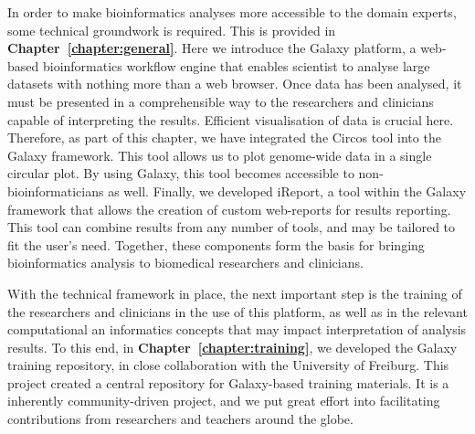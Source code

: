 In order to make bioinformatics analyses more accessible to the domain experts, some technical groundwork is required. This is provided in
\textbf{Chapter~\ref{chapter:general}}. Here we introduce the Galaxy platform, a web-based bioinformatics workflow engine that enables scientist to analyse large datasets with nothing more than a web browser.
Once data has been analysed, it must be presented in a comprehensible way to the researchers and clinicians capable of interpreting the results. Efficient visualisation of data is crucial here.
Therefore, as part of this chapter, we have integrated the Circos tool into the Galaxy framework. This tool allows us to plot genome-wide data in a single circular plot. By using Galaxy, this tool becomes accessible to non-bioinformaticians as well.
Finally, we developed iReport, a tool within the Galaxy framework that allows the creation of custom web-reports for results reporting. This tool can combine results from any number of tools, and may be tailored to fit the user's need. Together, these components form the basis for bringing bioinformatics analysis to biomedical researchers and clinicians.

With the technical framework in place, the next important step is the training of the researchers and clinicians in the use of this platform, as well as in the relevant computational an informatics concepts that may impact interpretation of analysis results.
To this end, in \textbf{Chapter~\ref{chapter:training}}, we developed the Galaxy training repository, in close collaboration with the University of Freiburg. This project created a central repository for Galaxy-based training materials. It is a inherently community-driven project, and we put great effort into facilitating contributions from researchers and teachers around the globe.

